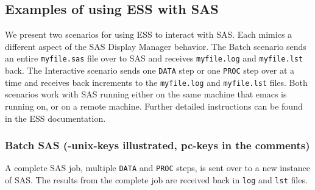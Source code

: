 \documentclass{article}
\newcommand{\elcode}[1]{\\{\texttt{\hspace*{2em} #1}}\\}
\begin{document}
\subsection{Examples of using ESS with SAS}
\label{sec:SAS:scen}

We present two scenarios for using ESS to interact with SAS.  Each
mimics a different aspect of the SAS Display Manager behavior.  The
Batch scenario sends an entire \texttt{myfile.sas} file over to SAS
and receives \texttt{myfile.log} and \texttt{myfile.lst} back.  The
Interactive scenario sends one \texttt{DATA} step or one \texttt{PROC}
step over at a time and receives back increments to the
\texttt{myfile.log} and \texttt{myfile.lst} files.  Both scenarios
work with SAS running either on the same machine that emacs is running
on, or on a remote machine.  Further detailed instructions can be
found in the ESS documentation.


\subsubsection{Batch SAS (-unix-keys illustrated, pc-keys in the comments)}
\label{sec:SAS:batch}

A complete SAS job, multiple \texttt{DATA} and \texttt{PROC} steps,
is sent over to a new instance of SAS.  The results from the complete
job are received back in \texttt{log} and \texttt{lst} files.
\end{document}
